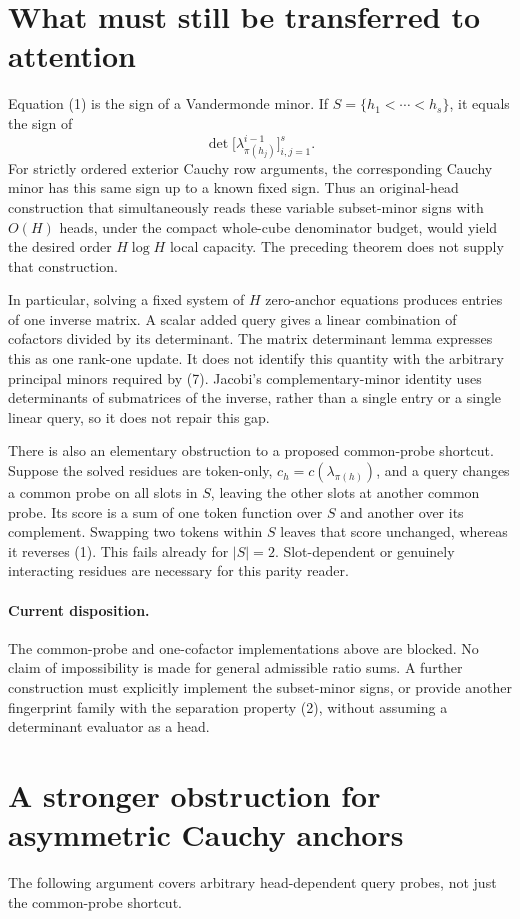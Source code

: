 \documentclass[11pt]{article}
\begin{document}
\section{What must still be transferred to attention}
Equation (1) is the sign of a Vandermonde minor. If
$S=\{h_1<\cdots<h_s\}$, it equals the sign of
\[
 \det\bigl[\lambda_{\pi(h_j)}^{i-1}\bigr]_{i,j=1}^s.
 \tag{7}
\]
For strictly ordered exterior Cauchy row arguments, the corresponding
Cauchy minor has this same sign up to a known fixed sign. Thus an
original-head construction that simultaneously reads these variable
subset-minor signs with $O(H)$ heads, under the compact whole-cube
denominator budget, would yield the desired order $H\log H$ local
capacity. The preceding theorem does not supply that construction.

In particular, solving a fixed system of $H$ zero-anchor equations
produces entries of one inverse matrix. A scalar added query gives
a linear combination of cofactors divided by its determinant.
The matrix determinant lemma expresses this as one rank-one update.
It does not identify this quantity with the arbitrary principal
minors required by (7). Jacobi's complementary-minor identity uses
determinants of submatrices of the inverse, rather than a single
entry or a single linear query, so it does not repair this gap.

There is also an elementary obstruction to a proposed common-probe
shortcut. Suppose the solved residues are token-only, $c_h=c(\lambda_{\pi(h)})$,
and a query changes a common probe on all slots in $S$, leaving the
other slots at another common probe. Its score is a sum of one
token function over $S$ and another over its complement. Swapping
two tokens within $S$ leaves that score unchanged, whereas it
reverses (1). This fails already for $|S|=2$. Slot-dependent or
genuinely interacting residues are necessary for this parity reader.

\paragraph{Current disposition.}
The common-probe and one-cofactor implementations above are blocked.
No claim of impossibility is made for general admissible ratio sums.
A further construction must explicitly implement the subset-minor
signs, or provide another fingerprint family with the separation
property (2), without assuming a determinant evaluator as a head.

\section{A stronger obstruction for asymmetric Cauchy anchors}
The following argument covers arbitrary head-dependent query probes,
not just the common-probe shortcut.
\end{document}
